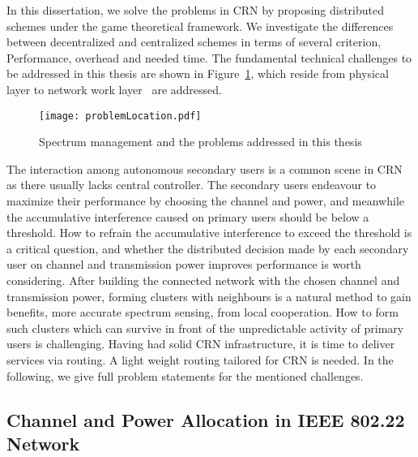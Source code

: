 In this dissertation, we solve the problems in CRN by proposing distributed schemes under the game theoretical framework.
We investigate the differences between decentralized and centralized schemes in terms of several criterion, \ie Performance, overhead and needed time.
The fundamental technical challenges to be addressed in this thesis are shown in Figure~\ref{problemLocation}, which reside from physical layer to network work layer~\cite{osi} are addressed. 

\begin{figure}[h!]
  \centering
  \texttt{[image: problemLocation.pdf]}
  \caption{Spectrum management and the problems addressed in this thesis}
\label{problemLocation}
\end{figure}

The interaction among autonomous secondary users is a common scene in CRN as there usually lacks central controller.
The secondary users endeavour to maximize their performance by choosing the channel and power, and meanwhile the accumulative interference caused on primary users should be below a threshold.
How to refrain the accumulative interference to exceed the threshold is a critical question, and whether the distributed decision made by each secondary user on channel and transmission power improves performance is worth considering.
After building the connected network with the chosen channel and transmission power, forming clusters with neighbours is a natural method to gain benefits, \ie more accurate spectrum sensing, from local cooperation.
How to form such clusters which can survive in front of the unpredictable activity of primary users is challenging.
Having had solid CRN infrastructure, it is time to deliver services via routing.
A light weight routing tailored for CRN is needed.
In the following, we give full problem statements for the mentioned challenges.



\subsection{Channel and Power Allocation in IEEE 802.22 Network}



